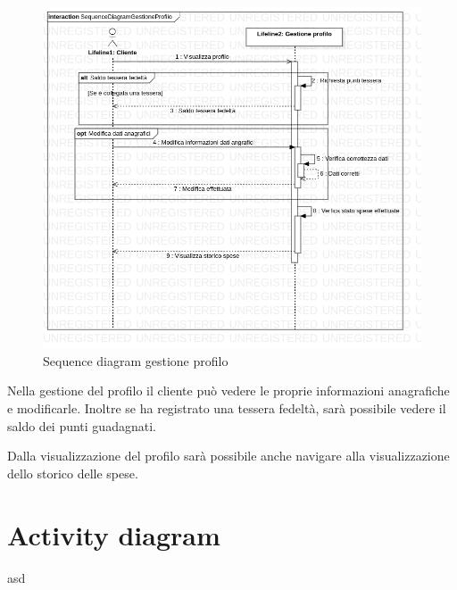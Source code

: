 \documentclass[12pt, a4paper]{article}
\begin{document}
\begin{figure}[h]
\centering
\includegraphics[width=\textwidth]{Use Case Model!Gestione profilo!InteractionGestioneProfilo!SequenceDiagramGestioneProfilo_5.png}
\caption{Sequence diagram gestione profilo}
\end{figure}

Nella gestione del profilo il cliente può vedere le proprie informazioni 
anagrafiche e modificarle. Inoltre se ha registrato una tessera fedeltà, sarà
possibile vedere il saldo dei punti guadagnati.

Dalla visualizzazione del profilo sarà possibile anche navigare alla
visualizzazione dello storico delle spese.

\newpage

\section{Activity diagram}

asd

\end{document}
